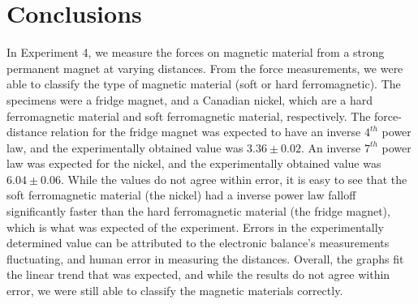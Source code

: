 \documentclass[letterpaper]{article}
\begin{document}
%
%


\section{Conclusions}
In Experiment 4, we measure the forces on magnetic material from a strong permanent magnet at varying distances.
From the force measurements, we were able to classify the type
of magnetic material (soft or hard ferromagnetic). The specimens were a fridge magnet, and a Canadian nickel, which are
a hard ferromagnetic material and soft ferromagnetic material, respectively.
The force-distance relation for the fridge magnet was expected to have an inverse $4^{th}$ power law, and the experimentally obtained
value was $3.36\pm0.02$.
An inverse $7^{th}$ power law was expected for the nickel, and the experimentally obtained value was $6.04\pm0.06$.
While the values do not agree within error, it is easy to see that the soft ferromagnetic material (the nickel) had a inverse power law
falloff significantly faster than the hard ferromagnetic material (the fridge magnet), which is what was expected of the experiment.
Errors in the experimentally determined value can be attributed to the electronic balance's measurements fluctuating, and
human error in measuring the distances. Overall, the graphs fit the linear trend that was expected, and while the
results do not agree within error, we were still able to classify the magnetic materials correctly.


% 
\end{document}
